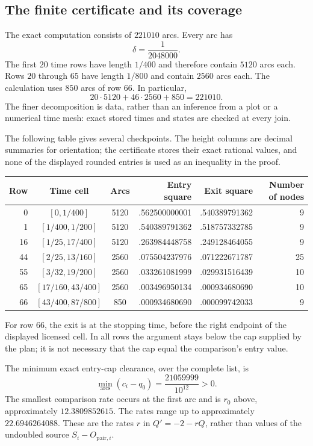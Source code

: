 \documentclass[11pt,a4paper]{article}
\theoremstyle{definition}
\theoremstyle{remark}
\begin{document}
\subsection{The finite certificate and its coverage}
\label{flow:finite-certificate}

The exact computation consists of $221010$ arcs.  Every arc has
\begin{equation}
 \delta=\frac1{2048000}.
 \label{flow:step}
\end{equation}
The first $20$ time rows have length $1/400$ and therefore contain
$5120$ arcs each.  Rows $20$ through $65$ have length $1/800$ and
contain $2560$ arcs each.  The calculation uses $850$ arcs of row $66$.
In particular,
\[
 20\cdot5120+46\cdot2560+850=221010.
\]
The finer decomposition is data, rather than an inference from a plot
or a numerical time mesh: exact stored times and states are checked at
every join.

The following table gives several checkpoints.  The height columns are
decimal summaries for orientation; the certificate stores their exact
rational values, and none of the displayed rounded entries is used as
an inequality in the proof.
\begin{center}
\small
\begin{tabular}{rccrrr}
\hline
Row & Time cell & Arcs & Entry square & Exit square & Number of nodes\\
\hline
0  & $[0,1/400]$ &5120& .562500000001& .540389791362&9\\
1  & $[1/400,1/200]$ &5120& .540389791362& .518757332785&9\\
16 & $[1/25,17/400]$ &5120& .263984448758& .249128464055&9\\
44 & $[2/25,13/160]$ &2560& .075504237976& .071222671787&25\\
55 & $[3/32,19/200]$ &2560& .033261081999& .029931516439&10\\
65 & $[17/160,43/400]$ &2560& .003496950134& .000934680690&10\\
66 & $[43/400,87/800]$ &850& .000934680690& .000099742033&9\\
\hline
\end{tabular}
\end{center}
For row $66$, the exit is at the stopping time, before the right
endpoint of the displayed licensed cell.  In all rows the argument stays
below the cap supplied by the plan; it is not necessary that the cap
equal the comparison's entry value.

The minimum exact entry-cap clearance, over the complete list, is
\begin{equation}
 \min_{\text{arcs}}(c_i-q_0)=\frac{21059999}{10^{12}}>0.
 \label{flow:cap-clearance}
\end{equation}
The smallest comparison rate occurs at the first arc and is $r_0$
above, approximately $12.3809852615$.  The rates range up to approximately
$22.6946264088$.  These are the rates $r$ in $Q'=-2-rQ$, rather than
values of the undoubled source $S_i-O_{\mathrm{pair},i}$.
\end{document}
